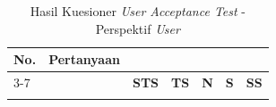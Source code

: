 \begin{longtable}{|p{0.8cm}|p{7.5cm}|>{\centering\arraybackslash}p{0.8cm}|>{\centering\arraybackslash}p{0.8cm}|>{\centering\arraybackslash}p{0.8cm}|>{\centering\arraybackslash}p{0.8cm}|>{\centering\arraybackslash}p{0.8cm}|}
    \caption{Hasil Kuesioner \textit{User Acceptance Test} - Perspektif \textit{User}} \label{tabel:uat_user_hasil}                                                                                                                                   \\
    \hline
    \multirow{2}{*}{\textbf{No.}}              & \multirow{2}{*}{\textbf{Pertanyaan}}                                                                   & \multicolumn{5}{c|}{\textbf{Jawaban}}                                                       \\ \cline{3-7}
                                               &                                                                                                        & \textbf{STS}                          & \textbf{TS} & \textbf{N} & \textbf{S} & \textbf{SS} \\
    \hline
    \endfirsthead



    \hline %
    \endlastfoot


\end{longtable}
